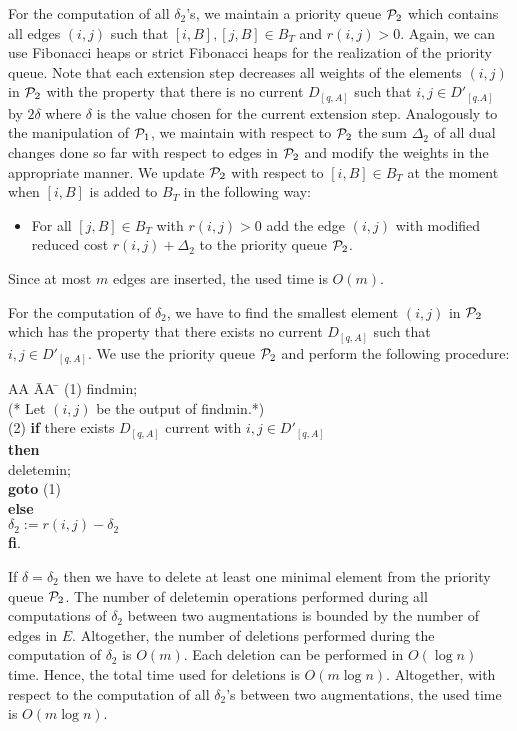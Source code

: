 \documentclass[12pt,twoside,a4paper]{article}
\begin{document}
For the computation of all $\delta_2$'s, we maintain a priority queue 
${\cal P}_2$ which contains all edges $(i,j)$ such that $[i,B], [j,B] \in B_T$ 
and $r(i,j) > 0$.
Again, we can use Fibonacci heaps or strict Fibonacci heaps for the realization 
of the priority queue.
Note that each extension step decreases all weights of the elements $(i,j)$ 
in ${\cal P}_2$ with the property that there is no current $D_{[q,A]}$ such that 
$i,j \in D'_{[q.A]}$ by $2\delta$ where $\delta$ is the value chosen for the 
current extension step.
Analogously to the manipulation of ${\cal P}_1$, we maintain with respect to 
${\cal P}_2$ the sum $\Delta_2$ of all dual changes done so far with respect to 
edges in ${\cal P}_2$ and modify the weights in the appropriate manner.
We update ${\cal P}_2$ with respect to $[i,B] \in B_T$ 
at the moment when $[i,B]$ is added to $B_T$ in the following way:
\begin{itemize}
\item
For all $[j,B] \in B_T$ with $r(i,j) > 0$ add the edge $(i,j)$ with modified
reduced cost $r(i,j) + \Delta_2$ to the priority queue ${\cal P}_2$.
\end{itemize}
Since at most $m$ edges are inserted, the used time is $O(m)$.
 
For the computation of $\delta_2$, we have to find the smallest element
$(i,j)$ in ${\cal P}_2$ which has the property that there exists no current $D_{[q,A]}$
such that $i,j \in D'_{[q,A]}$. We use the priority queue ${\cal P}_2$ and
perform the following procedure:

\begin{tabbing}
AA \= AA \= \kill
(1) findmin; \\ 
\> (* Let $(i,j)$ be the output of findmin.*) \\
(2) {\bf if} there exists $D_{[q,A]}$ current with $i,j \in D'_{[q,A]}$ \\
\> {\bf then} \\
\> \> deletemin; \\
\> \> {\bf goto} (1) \\
\> {\bf else} \\ 
\> \> $\delta_2 := r(i,j) - \delta_2$ \\
\> {\bf fi}.
\end{tabbing}

If $\delta = \delta_2$ then we have to delete at least one minimal
element from the priority queue ${\cal P}_2$. The number of deletemin operations
performed during all computations of $\delta_2$ between two augmentations is bounded by 
the number of edges in $E$.
Altogether, the number of deletions performed during the computation of
$\delta_2$ is $O(m)$. Each deletion can be performed in $O(\log n)$ time.
Hence, the total time used for deletions is $O(m \log n)$.
Altogether, with respect to the computation of all $\delta_2$'s between two
augmentations, the used time is $O(m \log n)$.
\end{document}
